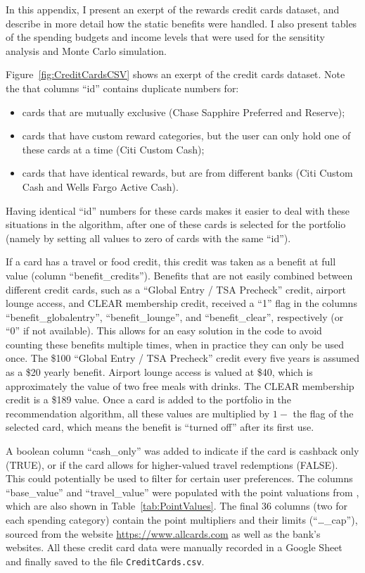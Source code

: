 In this appendix, I present an exerpt of the rewards credit cards dataset, and describe in more detail how the static benefits were handled. 
I also present tables of the spending budgets and income levels that were used for the sensitity analysis and Monte Carlo simulation. 

Figure~\ref{fig:CreditCardsCSV} shows an exerpt of the credit cards dataset. 
Note the that columns ``id'' contains duplicate numbers for:
\begin{itemize}
    \item cards that are mutually exclusive (Chase Sapphire Preferred and Reserve);
    \item cards that have custom reward categories, but the user can only hold one of these cards at a time (Citi Custom Cash);
    \item cards that have identical rewards, but are from different banks (Citi Custom Cash and Wells Fargo Active Cash).
\end{itemize}
Having identical ``id'' numbers for these cards makes it easier to deal with these situations in the algorithm, after one of these cards is selected for the portfolio (namely by setting all values to zero of cards with the same ``id'').

If a card has a travel or food credit, this credit was taken as a benefit at full value (column ``benefit\_credits''). Benefits that are not easily combined between different credit cards, such as a ``Global Entry / TSA Precheck'' credit, airport lounge access, and CLEAR membership credit, received a ``1'' flag in the columns ``benefit\_globalentry'', ``benefit\_lounge'', and ``benefit\_clear'', respectively (or ``0'' if not available). 
This allows for an easy solution in the code to avoid counting these benefits multiple times, when in practice they can only be used once. 
The \$100 ``Global Entry / TSA Precheck'' credit every five years is assumed as a \$20 yearly benefit. Airport lounge access is valued at \$40, which is approximately the value of two free meals with drinks. 
The CLEAR membership credit is a \$189 value. 
Once a card is added to the portfolio in the recommendation algorithm, all these values are multiplied by $1-$ the flag of the selected card, which means the benefit is ``turned off'' after its first use. 

A boolean column ``cash\_only'' was added to indicate if the card is cashback only (TRUE), or if the card allows for higher-valued travel redemptions (FALSE).
This could potentially be used to filter for certain user preferences.
The columns ``base\_value'' and ``travel\_value'' were populated with the point valuations from \citet{nerdwallet:2024}, which are also shown in Table~\ref{tab:PointValues}.
The final 36 columns (two for each spending category) contain the point multipliers and their limits (``\ldots\_cap''), sourced from the website \url{https://www.allcards.com} as well as the bank's websites. 
All these credit card data were manually recorded in a Google Sheet and finally saved to the file \texttt{CreditCards.csv}. 

